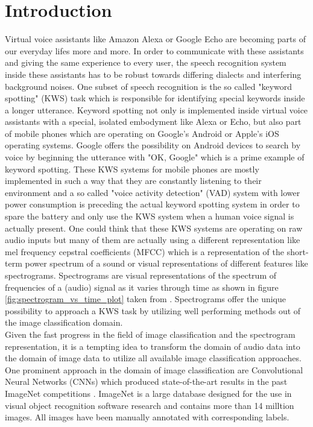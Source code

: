 \documentclass{article}
\theoremstyle{definition}
\theoremstyle{remark}
\begin{document}
\tableofcontents

\newpage

\section{Introduction}

Virtual voice assistants like Amazon Alexa or Google Echo are becoming parts of our everyday lifes more and more. In order to communicate with these assistants and giving the same experience to every user, the speech recognition system inside these assistants has to be robust towards differing dialects and interfering background noises. One subset of speech recognition is the so called "keyword spotting" (KWS) task which is responsible for identifying special keywords inside a longer utterance. Keyword spotting not only is implemented inside virtual voice assistants with a special, isolated embodyment like Alexa or Echo, but also part of mobile phones which are operating on Google's Android or Apple's iOS operating systems. Google offers the possibility on Android devices to search by voice by beginning the utterance with "OK, Google" \cite{schalkwyk2010your} which is a prime example of keyword spotting. These KWS systems for mobile phones are mostly implemented in such a way that they are constantly listening to their environment and a so called "voice activity detection" (VAD) system with lower power consumption is preceding the actual keyword spotting system in order to spare the battery and only use the KWS system when a human voice signal is actually present. One could think that these KWS systems are operating on raw audio inputs but many of them are actually using a different representation like mel frequency cepstral coefficients (MFCC) which is a representation of the short-term power spectrum of a sound or visual representations of different features like spectrograms. Spectrograms are visual representations of the spectrum of frequencies of a (audio) signal as it varies through time as shown in figure \ref{fig:spectrogram_vs_time_plot} taken from \cite{gouda2018speech}. Spectrograms offer the unique possibility to approach a KWS task by utilizing well performing methods out of the image classification domain.\\
Given the fast progress in the field of image classification and the spectrogram representation, it is a tempting idea to transform the domain of audio data into the domain of image data to utilize all available image classification approaches. One prominent approach in the domain of image classification are Convolutional Neural Networks (CNNs) which produced state-of-the-art results in the past ImageNet competitions \cite{deng2009imagenet} \cite{krizhevsky2012imagenet}. ImageNet is a large database designed for the use in visual object recognition software research and contains more than 14 milltion images. All images have been manually annotated with corresponding labels.\\
\end{document}
